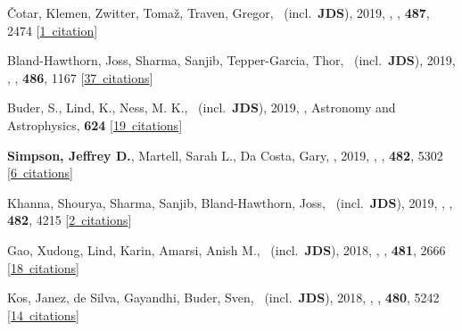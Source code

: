 \item[{\color{numcolor}\scriptsize28}] {\v{C}}otar, Klemen, Zwitter, Toma{\v{z}}, Traven, Gregor, \etal\ (incl.\ \textbf{JDS}), 2019, , \mnras, \textbf{487}, 2474 [\href{https://ui.adsabs.harvard.edu/#abs/2019MNRAS.487.2474C}{1~citation}]

\item[{\color{numcolor}\scriptsize27}] Bland-Hawthorn, Joss, Sharma, Sanjib, Tepper-Garcia, Thor, \etal\ (incl.\ \textbf{JDS}), 2019, , \mnras, \textbf{486}, 1167 [\href{https://ui.adsabs.harvard.edu/#abs/2019MNRAS.486.1167B}{37~citations}]

\item[{\color{numcolor}\scriptsize26}] Buder, S., Lind, K., Ness, M. K., \etal\ (incl.\ \textbf{JDS}), 2019, , Astronomy and Astrophysics, \textbf{624} [\href{https://ui.adsabs.harvard.edu/#abs/2019A&A...624A..19B}{19~citations}]

\item[{\color{numcolor}\scriptsize25}] \textbf{Simpson, Jeffrey D.}, Martell, Sarah L., Da Costa, Gary, \etal, 2019, , \mnras, \textbf{482}, 5302 [\href{https://ui.adsabs.harvard.edu/#abs/2019MNRAS.482.5302S}{6~citations}]

\item[{\color{numcolor}\scriptsize24}] Khanna, Shourya, Sharma, Sanjib, Bland-Hawthorn, Joss, \etal\ (incl.\ \textbf{JDS}), 2019, , \mnras, \textbf{482}, 4215 [\href{https://ui.adsabs.harvard.edu/#abs/2019MNRAS.482.4215K}{2~citations}]

\item[{\color{numcolor}\scriptsize23}] Gao, Xudong, Lind, Karin, Amarsi, Anish M., \etal\ (incl.\ \textbf{JDS}), 2018, , \mnras, \textbf{481}, 2666 [\href{https://ui.adsabs.harvard.edu/#abs/2018MNRAS.481.2666G}{18~citations}]

\item[{\color{numcolor}\scriptsize22}] Kos, Janez, de Silva, Gayandhi, Buder, Sven, \etal\ (incl.\ \textbf{JDS}), 2018, , \mnras, \textbf{480}, 5242 [\href{https://ui.adsabs.harvard.edu/#abs/2018MNRAS.480.5242K}{14~citations}]

